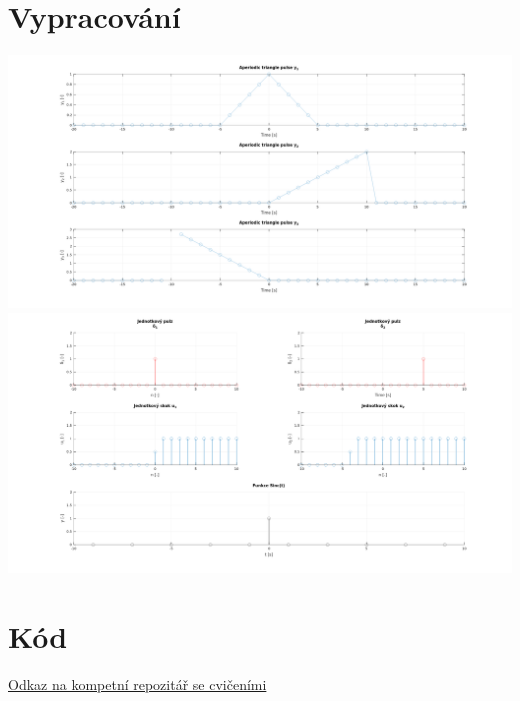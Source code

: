 \documentclass{article}
\begin{document}
\section{Vypracování}

\includegraphics[scale=0.35]{../assets/img.png}
\\
\includegraphics[scale=0.35]{../assets/img2.png}

\section{Kód}

\href{https://github.com/AleshR/AP8ZS}{Odkaz na kompetní repozitář se cvičeními}
\end{document}
